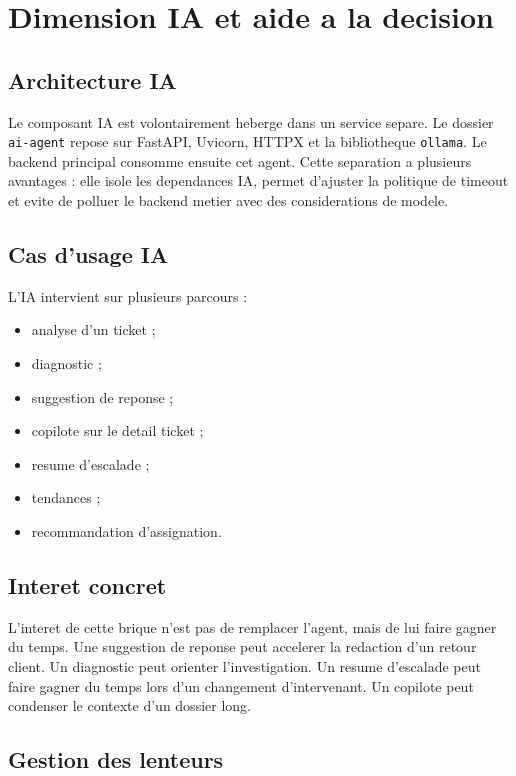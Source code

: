 \documentclass[12pt,a4paper,oneside]{report}
\begin{document}
\chapter{Dimension IA et aide a la decision}

\section{Architecture IA}

Le composant IA est volontairement heberge dans un service separe. Le dossier \texttt{ai-agent} repose sur FastAPI, Uvicorn, HTTPX et la bibliotheque \texttt{ollama}. Le backend principal consomme ensuite cet agent. Cette separation a plusieurs avantages : elle isole les dependances IA, permet d'ajuster la politique de timeout et evite de polluer le backend metier avec des considerations de modele.

\section{Cas d'usage IA}

L'IA intervient sur plusieurs parcours :

\begin{itemize}[leftmargin=1.2cm]
  \item analyse d'un ticket ;
  \item diagnostic ;
  \item suggestion de reponse ;
  \item copilote sur le detail ticket ;
  \item resume d'escalade ;
  \item tendances ;
  \item recommandation d'assignation.
\end{itemize}

\section{Interet concret}

L'interet de cette brique n'est pas de remplacer l'agent, mais de lui faire gagner du temps. Une suggestion de reponse peut accelerer la redaction d'un retour client. Un diagnostic peut orienter l'investigation. Un resume d'escalade peut faire gagner du temps lors d'un changement d'intervenant. Un copilote peut condenser le contexte d'un dossier long.

\section{Gestion des lenteurs}
\end{document}
